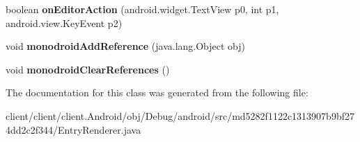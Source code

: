 \begin{DoxyCompactItemize}
\item 
\hypertarget{classmd5282f1122c1313907b9bf274dd2c2f344_1_1EntryRenderer_ad9cd9c7918d5d736a2f6acf2fb1cfaa3}{}boolean {\bfseries on\+Editor\+Action} (android.\+widget.\+Text\+View p0, int p1, android.\+view.\+Key\+Event p2)\label{classmd5282f1122c1313907b9bf274dd2c2f344_1_1EntryRenderer_ad9cd9c7918d5d736a2f6acf2fb1cfaa3}

\item 
\hypertarget{classmd5282f1122c1313907b9bf274dd2c2f344_1_1EntryRenderer_ad0b4b74898cda67897598e0f205f632c}{}void {\bfseries monodroid\+Add\+Reference} (java.\+lang.\+Object obj)\label{classmd5282f1122c1313907b9bf274dd2c2f344_1_1EntryRenderer_ad0b4b74898cda67897598e0f205f632c}

\item 
\hypertarget{classmd5282f1122c1313907b9bf274dd2c2f344_1_1EntryRenderer_ab3edc72eecc0604cbf6095a565083c5c}{}void {\bfseries monodroid\+Clear\+References} ()\label{classmd5282f1122c1313907b9bf274dd2c2f344_1_1EntryRenderer_ab3edc72eecc0604cbf6095a565083c5c}

\end{DoxyCompactItemize}


The documentation for this class was generated from the following file\+:\begin{DoxyCompactItemize}
\item 
client/client/client.\+Android/obj/\+Debug/android/src/md5282f1122c1313907b9bf274dd2c2f344/Entry\+Renderer.\+java\end{DoxyCompactItemize}
